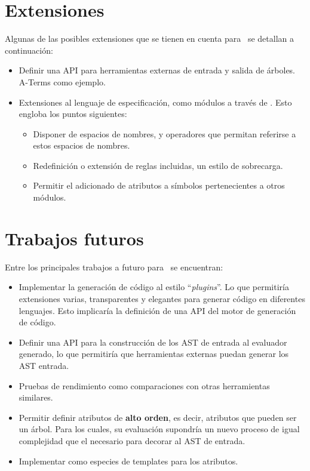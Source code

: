 \section{Extensiones}
Algunas de las posibles extensiones que se tienen en cuenta para \maggen\ se detallan a continuación:
\begin{itemize}
\item Definir una API para herramientas externas de entrada y salida de árboles. A-Terms como ejemplo.
\item Extensiones al lenguaje de especificación, como módulos a través de . Esto engloba los puntos siguientes:
\begin{itemize}
\item Disponer de espacios de nombres, y operadores que permitan referirse a estos espacios de nombres.
\item Redefinición o extensión de reglas incluidas, un estilo de sobrecarga.
\item Permitir el adicionado de atributos a símbolos pertenecientes a otros módulos.
\end{itemize}

\end{itemize}

\section{Trabajos futuros}
Entre los principales trabajos a futuro para \maggen\ se encuentran:
\begin{itemize}
\item Implementar la generación de código al estilo ``\textit{plugins}''. Lo que permitiría extensiones varias, transparentes y elegantes para generar código en diferentes lenguajes. Esto implicaría la definición de una API del motor de generación de código.

\item Definir una API para la construcción de los AST de entrada al evaluador generado, lo que permitiría que herramientas externas puedan generar los AST entrada. 
\item Pruebas de rendimiento como comparaciones con otras herramientas similares.

\item Permitir definir atributos de \textbf{alto orden}, es decir, atributos que pueden ser un árbol. Para los cuales, su evaluación supondría un nuevo proceso de igual complejidad que el necesario para decorar al AST de entrada.
\item Implementar como especies de templates para los atributos.

\end{itemize}